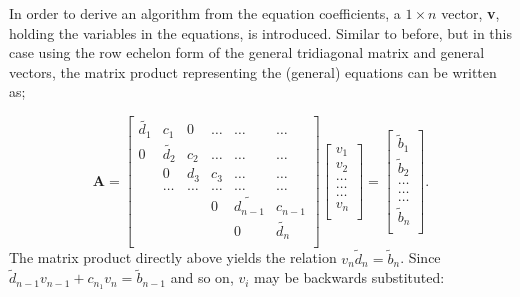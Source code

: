\documentclass[%
oneside,                 %
final,                   %
10pt]{article}
\begin{document}
In order to derive an algorithm from the equation coefficients, a $1\times n$ vector, \textbf{v}, holding the variables in the equations, is introduced. Similar to before, but in this case using the row echelon form of the general tridiagonal matrix and general vectors, the matrix product representing the (general) equations can be written as;

\[
    \mathbf{A} = \begin{bmatrix}
                      \tilde{d_1}& c_1 & 0 &\dots   & \dots &\dots  \\
                           0 & \tilde{d_2} & c_2 &\dots &\dots &\dots \\
                           & 0 & d_3 & c_3 & \dots & \dots     \\
                           & \dots   & \dots &\dots   &\dots  &\dots  \\
                           &   &  &0  &\tilde{d_{n-1}}& c_{n-1}  \\
                           &    &  &   &0 & \tilde{d_n}  \\
                      \end{bmatrix}\begin{bmatrix}
                           v_1\\
                           v_2\\
                           \dots \\
                          \dots  \\
                          \dots \\
                           v_n\\
                      \end{bmatrix}
  =\begin{bmatrix}
                           \tilde{b}_1\\
                           \tilde{b}_2\\
                           \dots \\
                           \dots \\
                          \dots \\
                           \tilde{b}_n\\
                      \end{bmatrix}.
                      \label{finalmatrixproduct}
\]
The matrix product directly above yields the relation $v_n \tilde{d}_n=\tilde{b}_n$. Since $\tilde{d}_{n-1} v_{n-1} + c_{n_1} v_n = \tilde{b}_{n-1}$ and so on, $v_i$ may be backwards substituted:\par 
\end{document}
